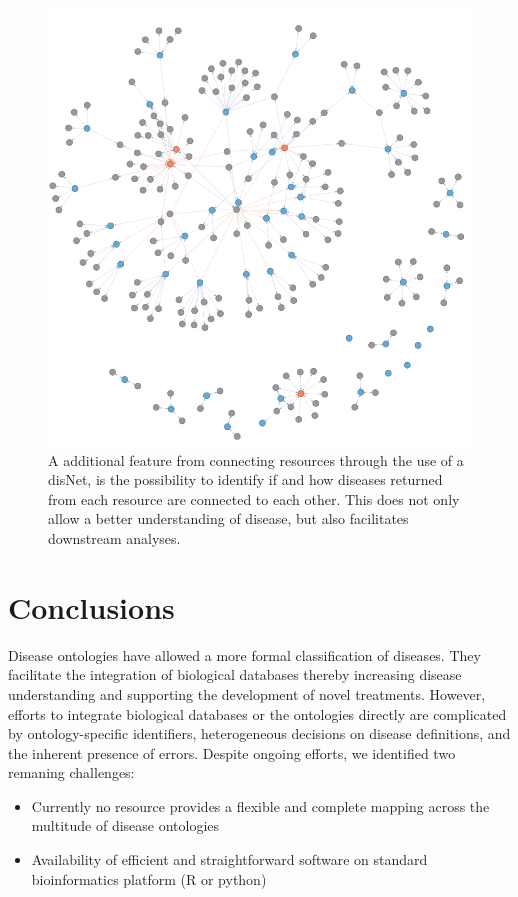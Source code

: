 \documentclass[9pt,a4paper,]{extarticle}
\begin{document}
\begin{figure}

{\centering \includegraphics[width=0.5\linewidth]{fig/trace_connections} 

}

\caption{A additional feature from connecting resources through the use of a disNet, is the possibility to identify if and how diseases returned from each resource are connected to each other. This does not only allow a better understanding of disease, but also facilitates downstream analyses.}\label{fig:traceConn}
\end{figure}

\hypertarget{conclusions}{%
\section{Conclusions}\label{conclusions}}

Disease ontologies have allowed a more formal classification of diseases. They facilitate the integration of biological databases thereby increasing disease understanding and supporting the development of novel treatments. However, efforts to integrate biological databases or the ontologies directly are complicated by ontology-specific identifiers, heterogeneous decisions on disease definitions, and the inherent presence of errors. Despite ongoing efforts, we identified two remaning challenges:

\begin{itemize}
\item
  Currently no resource provides a flexible and complete mapping across the multitude of disease ontologies
\item
  Availability of efficient and straightforward software on standard bioinformatics platform (R or python)
\end{itemize}
\end{document}
